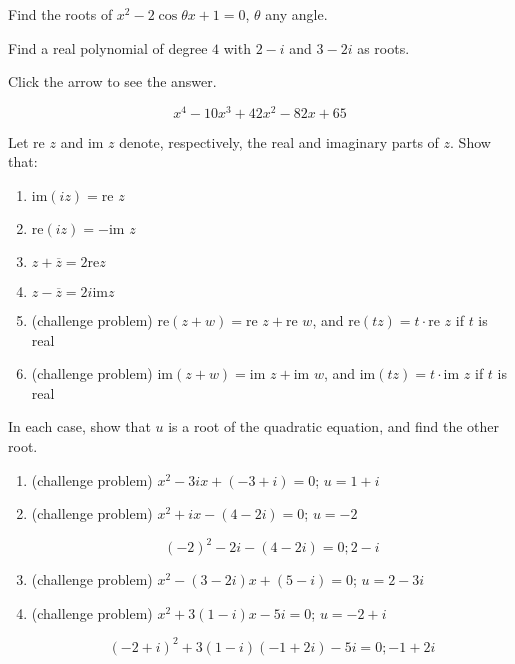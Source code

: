 \documentclass{ximera}
\begin{document}
\begin{problem}\label{prb:A.7}
Find the roots of $x^{2} - 2\cos \theta x + 1 = 0$, $\theta$ any angle.
\end{problem}

\begin{problem}\label{prb:A.8}
Find a real polynomial of degree $4$ with $2 - i$ and $3 - 2i$ as roots.

Click the arrow to see the answer.
\begin{expandable}{}{}
$$x^{4} - 10x^{3} + 42x^{2} - 82x + 65$$
\end{expandable}
\end{problem}

\begin{problem}\label{prb:A.9}
Let $\mbox{re }z$ and $\mbox{im }z$ denote, respectively, the real and imaginary parts of $z$. Show that:

\begin{enumerate}
\item $\mbox{im}(iz) = \mbox{re }z$
\item $\mbox{re}(iz) = -\mbox{im }z$
\item $z + \overline{z} = 2 \mbox{re}z$
\item $z - \overline{z} = 2i \mbox{im} z$
\item (challenge problem) $\mbox{re}(z + w) = \mbox{re }z + \mbox{re }w$, and $\mbox{re}(tz) = t \cdot \mbox{re }z$ if $t$ is real
\item (challenge problem) $\mbox{im}(z + w) = \mbox{im }z + \mbox{im }w$, and $\mbox{im}(tz) = t \cdot \mbox{im }z$ if $t$ is real
\end{enumerate}
\end{problem}

\begin{problem}\label{prb:A.10}
In each case, show that $u$ is a root of the quadratic equation, and find the other root.

\begin{enumerate}
\item (challenge problem) $x^{2} - 3ix + (-3 + i) = 0$; $u = 1 + i$
\item (challenge problem) $x^{2} + ix - (4 - 2i) = 0$; $u = -2$
\begin{hint}
$$(-2)^{2} - 2i - (4 - 2i) = 0; 2 - i$$
\end{hint}
\item (challenge problem) $x^{2} - (3 - 2i)x + (5 - i) = 0$; $u = 2 - 3i$
\item (challenge problem) $x^{2} + 3(1 - i)x - 5i = 0$; $u = -2 + i$
\begin{hint}
$$(-2 + i)^{2} + 3(1 - i)(-1 + 2i) - 5i = 0; -1 + 2i$$
\end{hint}
\end{enumerate}
\end{problem}
\end{document}
